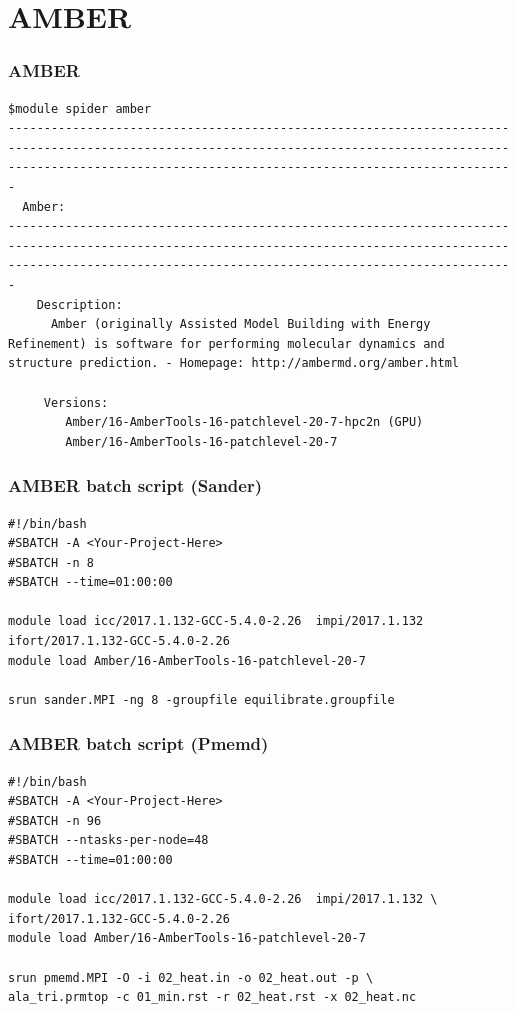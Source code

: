 \section{AMBER}

\begin{frame}[fragile]
	\frametitle{AMBER}
{\small 
        \begin{verbatim}             
$module spider amber
-------------------------------------------------------------------------------------------------------------------------------------------------------------------------------------------------------------------
  Amber:
-------------------------------------------------------------------------------------------------------------------------------------------------------------------------------------------------------------------
    Description:
      Amber (originally Assisted Model Building with Energy Refinement) is software for performing molecular dynamics and structure prediction. - Homepage: http://ambermd.org/amber.html 

     Versions:
        Amber/16-AmberTools-16-patchlevel-20-7-hpc2n (GPU)
        Amber/16-AmberTools-16-patchlevel-20-7

        \end{verbatim}
}
\end{frame}

\begin{frame}[fragile]
	\frametitle{AMBER batch script (Sander)}
        \begin{verbatim}             
#!/bin/bash
#SBATCH -A <Your-Project-Here>
#SBATCH -n 8
#SBATCH --time=01:00:00

module load icc/2017.1.132-GCC-5.4.0-2.26  impi/2017.1.132 ifort/2017.1.132-GCC-5.4.0-2.26
module load Amber/16-AmberTools-16-patchlevel-20-7

srun sander.MPI -ng 8 -groupfile equilibrate.groupfile
        \end{verbatim}

\end{frame}

\begin{frame}[fragile]
	\frametitle{AMBER batch script (Pmemd)}
        \begin{verbatim}             
#!/bin/bash
#SBATCH -A <Your-Project-Here>
#SBATCH -n 96
#SBATCH --ntasks-per-node=48
#SBATCH --time=01:00:00

module load icc/2017.1.132-GCC-5.4.0-2.26  impi/2017.1.132 \
ifort/2017.1.132-GCC-5.4.0-2.26
module load Amber/16-AmberTools-16-patchlevel-20-7

srun pmemd.MPI -O -i 02_heat.in -o 02_heat.out -p \
ala_tri.prmtop -c 01_min.rst -r 02_heat.rst -x 02_heat.nc
        \end{verbatim}

\end{frame}

